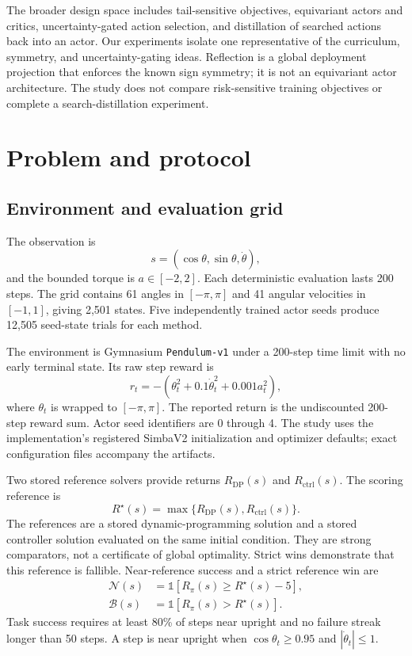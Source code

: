\documentclass[10pt,twocolumn]{article}
\begin{document}
The broader design space includes tail-sensitive objectives, equivariant actors and critics, uncertainty-gated action selection, and distillation of searched actions back into an actor. Our experiments isolate one representative of the curriculum, symmetry, and uncertainty-gating ideas. Reflection is a global deployment projection that enforces the known sign symmetry; it is not an equivariant actor architecture. The study does not compare risk-sensitive training objectives or complete a search-distillation experiment.

\section{Problem and protocol}

\subsection{Environment and evaluation grid}

The observation is
\[
s=(\cos\theta,\sin\theta,\dot{\theta}),
\]
and the bounded torque is $a\in[-2,2]$. Each deterministic evaluation lasts 200 steps. The grid contains 61 angles in $[-\pi,\pi]$ and 41 angular velocities in $[-1,1]$, giving 2,501 states. Five independently trained actor seeds produce 12,505 seed-state trials for each method.

The environment is Gymnasium \texttt{Pendulum-v1} under a 200-step time limit with no early terminal state. Its raw step reward is
\[
r_t=-\left(\theta_t^2+0.1\dot{\theta}_t^2+0.001a_t^2\right),
\]
where $\theta_t$ is wrapped to $[-\pi,\pi]$. The reported return is the undiscounted 200-step reward sum. Actor seed identifiers are 0 through 4. The study uses the implementation's registered SimbaV2 initialization and optimizer defaults; exact configuration files accompany the artifacts.

Two stored reference solvers provide returns $R_{\mathrm{DP}}(s)$ and $R_{\mathrm{ctrl}}(s)$. The scoring reference is
\[
R^\star(s)=\max\{R_{\mathrm{DP}}(s),R_{\mathrm{ctrl}}(s)\}.
\]
The references are a stored dynamic-programming solution and a stored controller solution evaluated on the same initial condition. They are strong comparators, not a certificate of global optimality. Strict wins demonstrate that this reference is fallible.
Near-reference success and a strict reference win are
\begin{align}
\mathcal{N}(s)&=\mathbb{1}[R_\pi(s)\geq R^\star(s)-5],\\
\mathcal{B}(s)&=\mathbb{1}[R_\pi(s)>R^\star(s)].
\end{align}
Task success requires at least 80\% of steps near upright and no failure streak longer than 50 steps. A step is near upright when $\cos\theta_t\geq0.95$ and $|\dot{\theta}_t|\leq1$.
\end{document}

